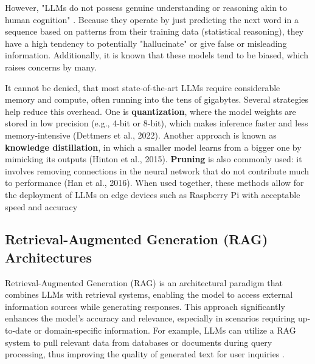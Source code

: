 However, "LLMs do not possess genuine understanding or reasoning akin to human cognition" \cite{li_survey_2024}. Because they operate by just predicting the next word in a sequence based on patterns from their training data (statistical reasoning), they have a high tendency to potentially "hallucinate" or give false or misleading information. Additionally, it is known that these models tend to be biased, which raises concerns by many.

It cannot be denied, that most state-of-the-art LLMs require considerable memory and compute, often running into the tens of gigabytes. Several strategies help reduce this overhead. One is \textbf{quantization}, where the model weights are stored in low precision (e.g., 4-bit or 8-bit), which makes inference faster and less memory-intensive (Dettmers et al., 2022). Another approach is known as \textbf{knowledge distillation}, in which a smaller model learns from a bigger one by mimicking its outputs (Hinton et al., 2015). \textbf{Pruning} is also commonly used: it involves removing connections in the neural network that do not contribute much to performance (Han et al., 2016). When used together, these methods allow for the deployment of LLMs on edge devices such as Raspberry Pi with acceptable speed and accuracy \cite{zhang-kennedy_systematic_2021}

\subsection{Retrieval-Augmented Generation (RAG) Architectures}
\label{subsec:background:first_section:second_subsection}

Retrieval-Augmented Generation (RAG) is an architectural paradigm that combines LLMs with retrieval systems, enabling the model to access external information sources while generating responses. This approach significantly enhances the model's accuracy and relevance, especially in scenarios requiring up-to-date or domain-specific information. For example, LLMs can utilize a RAG system to pull relevant data from databases or documents during query processing, thus improving the quality of generated text for user inquiries \cite{wang_survey_2024, jeong_adaptive-rag_2024}.


